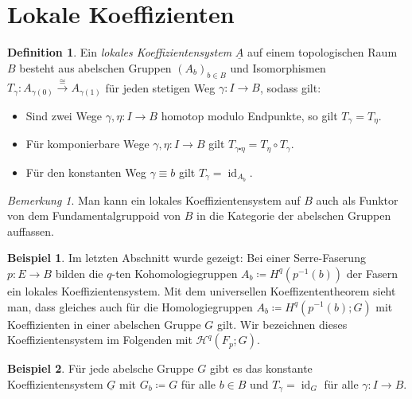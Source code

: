 \documentclass[11pt, a4paper, german]{article}
\theoremstyle{definition}
\newtheorem{bsp}{Beispiel}
\newtheorem{defn}{Definition}
\theoremstyle{remark}
\newtheorem*{bem}{Bemerkung}
\DeclareMathOperator{\id}{id} %
\newcommand{\LH}{\mathcal{H}} %
\begin{document}
\section{Lokale Koeffizienten}


\begin{defn}
  Ein \emph{lokales Koeffizientensystem} $\underline{A}$ auf einem topologischen Raum $B$ besteht aus abelschen Gruppen $(A_b)_{b \in B}$ und Isomorphismen $T_\gamma : A_{\gamma(0)} \xrightarrow{\cong} A_{\gamma(1)}$ für jeden stetigen Weg $\gamma : I \to B$, sodass gilt:
  \begin{itemize}
    \item Sind zwei Wege $\gamma, \eta : I \to B$ homotop modulo Endpunkte, so gilt $T_\gamma = T_\eta$.
    \item Für komponierbare Wege $\gamma, \eta : I \to B$ gilt $T_{\gamma \centerdot \eta} = T_\eta \circ T_\gamma$.
    \item Für den konstanten Weg $\gamma \equiv b$ gilt $T_\gamma = \id_{A_b}$.
  \end{itemize}
\end{defn}

\begin{bem}
  Man kann ein lokales Koeffizientensystem auf $B$ auch als Funktor von dem Fundamentalgruppoid von $B$ in die Kategorie der abelschen Gruppen auffassen.
\end{bem}

\begin{bsp}
  Im letzten Abschnitt wurde gezeigt: Bei einer Serre-Faserung $p : E \to B$ bilden die $q$-ten Kohomologiegruppen $A_b \coloneqq H^q(p^{-1}(b))$ der Fasern ein lokales Koeffizientensystem.
  Mit dem universellen Koeffizententheorem sieht man, dass gleiches auch für die Homologiegruppen $A_b \coloneqq H^q(p^{-1}(b); G)$ mit Koeffizienten in einer abelschen Gruppe $G$ gilt.
  Wir bezeichnen dieses Koeffizientensystem im Folgenden mit $\LH^q(F_p; G)$. %
\end{bsp}

\begin{bsp}
  Für jede abelsche Gruppe $G$ gibt es das konstante Koeffizientensystem $\underline{G}$ mit $G_b \coloneqq G$ für alle $b \in B$ und $T_\gamma = \id_G$ für alle $\gamma : I \to B$.
\end{bsp}
\end{document}
